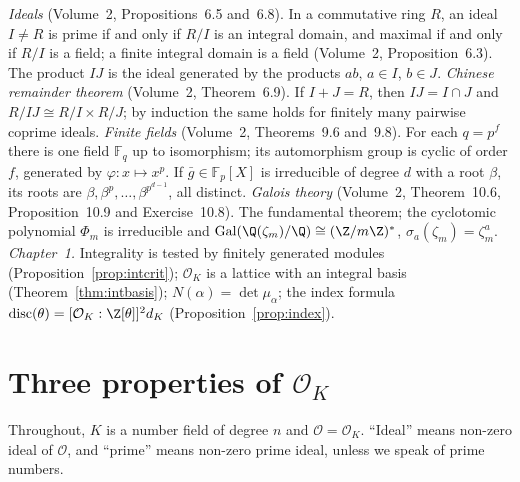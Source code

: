 \begin{reminder}
\emph{Ideals} (Volume~2, Propositions~6.5 and~6.8). In a commutative ring $R$, an ideal $I\ne R$ is prime if and only if
$R/I$ is an integral domain, and maximal if and only if $R/I$ is a field; a finite integral domain is a field (Volume~2,
Proposition~6.3). The product $IJ$ is the ideal generated by the products $ab$, $a\in I$, $b\in J$.
\emph{Chinese remainder theorem} (Volume~2, Theorem~6.9). If $I+J=R$, then $IJ=I\cap J$ and $R/IJ\cong R/I\times R/J$; by
induction the same holds for finitely many pairwise coprime ideals.
\emph{Finite fields} (Volume~2, Theorems~9.6 and~9.8). For each $q=p^f$ there is one field $\mathbb F_q$ up to isomorphism;
its automorphism group is cyclic of order $f$, generated by $\varphi:x\mapsto x^p$. If $\bar g\in\mathbb F_p[X]$ is
irreducible of degree $d$ with a root $\beta$, its roots are $\beta,\beta^p,\dots,\beta^{p^{d-1}}$, all distinct.
\emph{Galois theory} (Volume~2, Theorem~10.6, Proposition~10.9 and Exercise~10.8). The fundamental theorem; the cyclotomic
polynomial $\Phi_m$ is irreducible and $\operatorname{Gal}(\Q(\zeta_m)/\Q)\cong(\Z/m\Z)^*$, $\sigma_a(\zeta_m)=\zeta_m^a$.
\emph{Chapter~1.} Integrality is tested by finitely generated modules (Proposition~\ref{prop:intcrit}); $\mathcal O_K$
is a lattice with an integral basis (Theorem~\ref{thm:intbasis}); $N(\alpha)=\det\mu_\alpha$; the index formula
$\operatorname{disc}(\theta)=[\mathcal O_K:\Z[\theta]]^2d_K$ (Proposition~\ref{prop:index}).
\end{reminder}

\section{Three properties of $\mathcal O_K$}

Throughout, $K$ is a number field of degree $n$ and $\mathcal O=\mathcal O_K$. ``Ideal'' means non-zero ideal of
$\mathcal O$, and ``prime'' means non-zero prime ideal, unless we speak of prime numbers.

